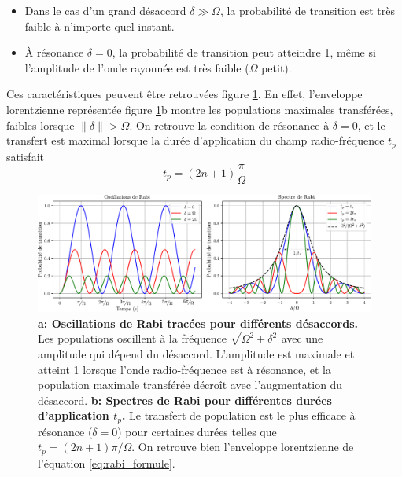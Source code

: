 \begin{itemize}
\item[\textendash] Dans le cas d'un grand désaccord $\delta \gg \Omega$, la probabilité de transition est très faible à n'importe quel instant.
\item[\textendash] À résonance $\delta=0$, la probabilité de transition peut atteindre 1, même si l'amplitude de l'onde rayonnée est très faible ($\Omega$ petit).
\end{itemize}
Ces caractéristiques peuvent être retrouvées figure \ref{fig:rabi}. En effet, l'enveloppe lorentzienne représentée figure \ref{fig:rabi}b montre les populations maximales transférées, faibles lorsque $\| \delta \| > \Omega$. On retrouve la condition de résonance à $\delta=0$, et le transfert est maximal lorsque la durée d'application du champ radio-fréquence $t_p$ satisfait
\begin{equation}
t_p=(2n+1) \frac{\pi}{\Omega}
\end{equation}

\begin{figure}
\centering
\includegraphics[width=\textwidth]{fig/BEC_manip/rabi.pdf}
\caption{\textbf{a: Oscillations de Rabi tracées pour différents désaccords.} Les populations oscillent à la fréquence $\sqrt{\Omega^2+\delta^2}$ avec une amplitude qui dépend du désaccord. L'amplitude est maximale et atteint 1 lorsque l'onde radio-fréquence est à résonance, et la population maximale transférée décroît avec l'augmentation du désaccord. \textbf{b: Spectres de Rabi pour différentes durées d'application $t_p$.} Le transfert de population est le plus efficace à résonance ($\delta=0$) pour certaines durées telles que $t_p= (2n+1) \pi/ \Omega$. On retrouve bien l'enveloppe lorentzienne de l'équation \ref{eq:rabi_formule}.}
\label{fig:rabi}
\end{figure}






